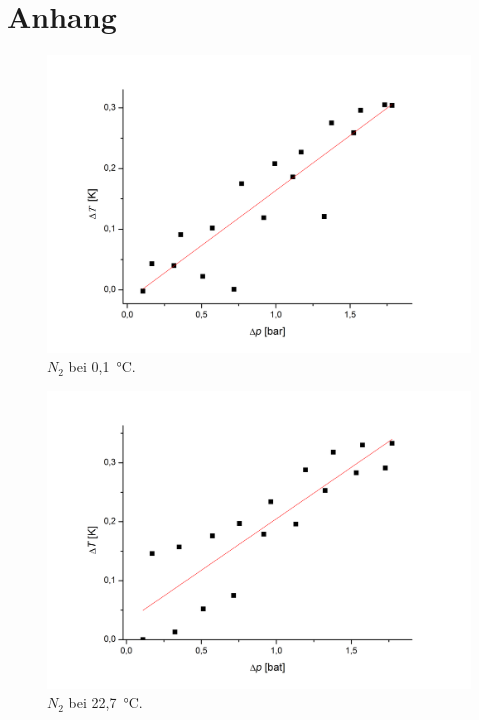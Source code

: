 \documentclass[a4paper,12pt,oneside,onecolum,final,openany]{report}
\begin{document}
\chapter{Anhang}
\begin{center}
\begin{figure}[h]
\includegraphics[width=13.5cm]{N2bei0Grad.png}
\caption{$N_2$ bei 0,1~°C.}
\end{figure}
\end{center}
\begin{center}
\begin{figure}[h]
\includegraphics[width=13.5cm]{N2bei22,7.png}
\caption{$N_2$ bei 22,7~°C.}
\end{figure}
\end{center}
\end{document}
